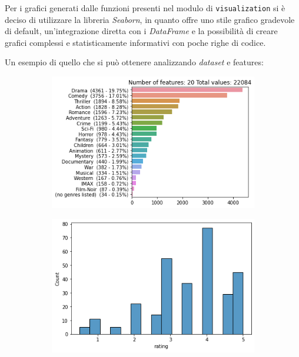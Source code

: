 Per i grafici generati dalle funzioni presenti nel modulo di \texttt{visualization} si è deciso di utilizzare la libreria \textit{Seaborn}, in quanto offre uno stile grafico gradevole di default, un'integrazione diretta con i \textit{DataFrame} e la possibilità di creare grafici complessi e statisticamente informativi con poche righe di codice.

Un esempio di quello che si può ottenere analizzando \textit{dataset} e features:

\begin{figure}[htbp]
    \centering

    \begin{subfigure}[b]{0.60\textwidth}
        \includegraphics[width=\textwidth]{figures/visualization/output.png}
    \end{subfigure}
    \hfill
    \begin{subfigure}[b]{0.49\textwidth}
        \includegraphics[width=\textwidth]{figures/visualization/output2.png}

\end{subfigure}
\end{figure}

